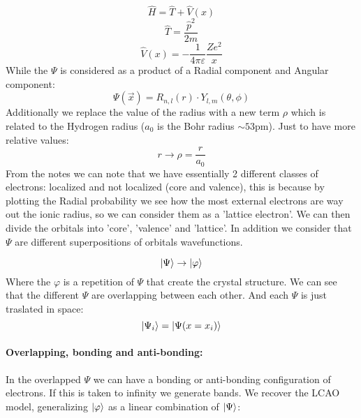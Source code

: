 \begin{equation}
    \hat{H} = \hat{T} + \hat{V}(x)
\end{equation}
\begin{equation}
    \hat{T} = \frac{\hat{p}^2}{2m}
\end{equation}
\begin{equation}
    \hat{V}(x) = -\frac{1}{4\pi\varepsilon}\frac{Ze^2}{x}
\end{equation}
While the $\Psi$ is considered as a product of a Radial component and Angular component:
\begin{equation}
    \Psi(\vec{x}) = R_{n,l}(r) \cdot Y_{l,m}(\theta, \phi)
\end{equation}
Additionally we replace the value of the radius with a new term $\rho$ which is related to the Hydrogen radius ($a_0$ is the Bohr radius $\sim 53$pm). Just to have more relative values:
\begin{equation}
    r \rightarrow \rho = \frac{r}{a_0}
\end{equation}
From the notes we can note that we have essentially 2 different classes of electrons: localized and not localized (core and valence), this is because by plotting the Radial probability we see how the most external electrons are way out the ionic radius, so we can consider them as a 'lattice electron'. We can then divide the orbitals into 'core', 'valence' and 'lattice'. In addition we consider that $\Psi$ are different superpositions of orbitals wavefunctions.

\begin{equation}
    \ket{\Psi} \rightarrow \ket{\varphi}
\end{equation}
Where the $\varphi$ is a repetition of $\Psi$ that create the crystal structure. We can see that the different $\Psi$ are overlapping between each other. And each $\Psi$ is just traslated in space:
\begin{equation}
    \ket{\Psi_i} = \ket{\Psi(x = x_i)}
\end{equation}

\paragraph{Overlapping, bonding and anti-bonding:} In the overlapped $\Psi$ we can have a bonding or anti-bonding configuration of electrons. If this is taken to infinity we generate bands. We recover the LCAO model, generalizing $\ket{\varphi}$ as a linear combination of $\ket{\Psi}$:


